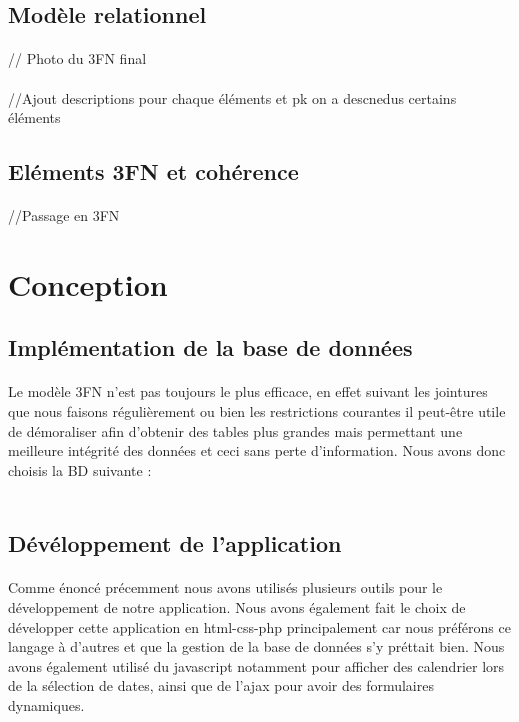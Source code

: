 \documentclass[a4paper, 12pt]{article}
\begin{document}
\subsection{Modèle relationnel}
\paragraph{} // Photo du 3FN final
\paragraph{} //Ajout descriptions pour chaque éléments et pk on a descnedus certains éléments
\subsection{Eléments 3FN et cohérence}
\paragraph{} //Passage en  3FN

\newpage

\section{Conception}
\subsection{Implémentation de la base de données}
\paragraph{}Le modèle 3FN n'est pas toujours le plus efficace, en effet suivant les jointures que nous faisons régulièrement ou bien les restrictions courantes il peut-être utile de démoraliser afin d'obtenir des tables plus grandes mais permettant une meilleure intégrité des données et ceci sans perte d'information. Nous avons donc choisis la BD suivante :
\\ \\

\newpage
\subsection{Dévéloppement de l'application}
\paragraph{}Comme énoncé précemment nous avons utilisés plusieurs outils pour le développement de notre application. Nous avons également fait le choix de développer cette application en html-css-php principalement car nous préférons ce langage à d'autres et que la gestion de la base de données s'y préttait bien. Nous avons également utilisé du javascript notamment pour afficher des calendrier lors de la sélection de dates, ainsi que de l'ajax pour avoir des formulaires dynamiques.
\end{document}
